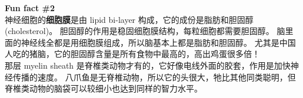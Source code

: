 \documentclass[orivec]{llncs}
\newcommand{\cc}[2]{#1}
\newcommand{\cc}[2]{#2}
\newcommand{\emp}[1]{{\color{blue}\textbf{#1}}}
\begin{document}
\begin{tcolorbox}[colback=lightyellow, breakable, enhanced]
\emp{Fun fact \#2} \\

\cc{
神经细胞的\emp{细胞膜}是由 lipid bi-layer 构成，它的成份是脂肪和胆固醇 (cholesterol)。 胆固醇的作用是稳固细胞膜结构，每粒细胞都需要胆固醇。 脑里面的神经线全都是用细胞膜组成，所以脑基本上都是脂肪和胆固醇。  尤其是中国人吃的猪脑，它的胆固醇含量是所有食物中最高的，高出鸡蛋很多倍！ \\

那层 myelin sheath 是脊椎类动物才有的，它好像电线外面的胶套，作用是加快神经传播的速度。 八爪鱼是无脊椎动物，所以它的头很大，牠比其他同类聪明，但脊椎类动物的脑袋可以较细小也达到同样的智力水平。
}{
The neuron's \textbf{cell membrane} is a \textbf{lipid bi-layer}, made up of fats and cholesterol.  The function of cholesterol is to make the membrane structurally stable, therefore every cell needs cholesterol.  The ``wires'' in the brain are all made of cell membranes, so the brain is basically made up of fats and cholesterol.  In particular, the pig's brain which is a kind of Chinese food, has the highest cholesterol content of all foods, many times more than eggs! \\

The \textbf{myelin sheath}, unique to vertebrates, is like the plastic insulation of electric wires, whose effect is to speed up electrical transmission.  The octopus is an invertebrate, that's why it needs a big head to achieve the same level intelligence as vertebrate animals of comparable brain size.
}
\end{tcolorbox}
\end{document}
